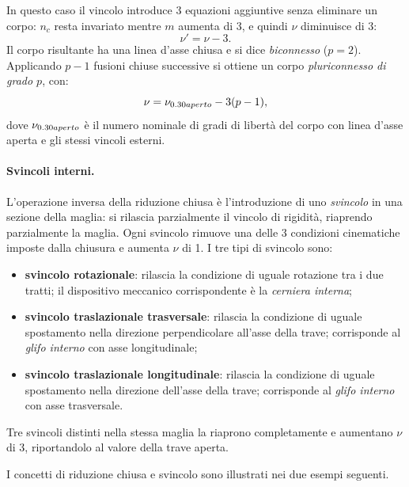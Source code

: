 In questo caso il vincolo introduce 3 equazioni aggiuntive
senza eliminare un corpo: $n_c$ resta invariato mentre $m$
aumenta di 3, e quindi $\nu$ diminuisce di 3:
\begin{equation}\label{eq:nu_chiusura}
	\nu' = \nu - 3.
\end{equation}
Il corpo risultante ha una linea d'asse chiusa e si dice
\emph{biconnesso} ($p = 2$). Applicando $p-1$ fusioni chiuse
successive si ottiene un corpo \emph{pluriconnesso di grado
	$p$}, con:
\begin{equation}\label{eq:nu_pluriconnesso}
	\nu = \nu_{\rm aperto} - 3(p-1),
\end{equation}
dove $\nu_{\rm aperto}$ è il numero nominale di gradi di
libertà del corpo con linea d'asse aperta e gli stessi vincoli
esterni.

\paragraph{Svincoli interni.}
L'operazione inversa della riduzione chiusa è l'introduzione di
uno \emph{svincolo} in una sezione della maglia: si rilascia
parzialmente il vincolo di rigidità, riaprendo parzialmente
la maglia. Ogni svincolo rimuove una delle 3 condizioni
cinematiche imposte dalla chiusura e aumenta $\nu$ di 1.
I tre tipi di svincolo sono:
\begin{itemize}[nosep]
	\item \textbf{svincolo rotazionale}: rilascia la 
	condizione di uguale rotazione tra i due tratti; 
	il dispositivo meccanico corrispondente è la 
	\emph{cerniera interna};
	\item \textbf{svincolo traslazionale trasversale}: 
	rilascia la condizione di uguale spostamento nella 
	direzione perpendicolare all'asse della trave; 
	corrisponde al \emph{glifo interno} con asse 
	longitudinale;
	\item \textbf{svincolo traslazionale longitudinale}: 
	rilascia la condizione di uguale spostamento nella 
	direzione dell'asse della trave; corrisponde al 
	\emph{glifo interno} con asse trasversale.
\end{itemize}
Tre svincoli distinti nella stessa maglia la riaprono
completamente e aumentano $\nu$ di 3, riportandolo al valore
della trave aperta.

I concetti di riduzione chiusa e svincolo sono illustrati nei
due esempi seguenti.

